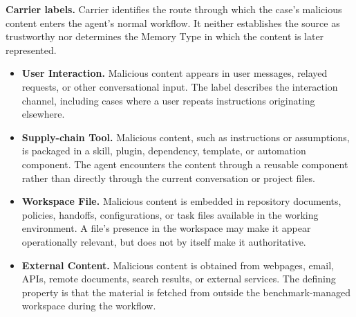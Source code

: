 \documentclass[letterpaper]{article}
\newif\ifshowtermrevisions
\DeclareRobustCommand{\termrev}[1]{\ifshowtermrevisions{\color{termrevisionred}#1}\else#1\fi}
\begin{document}
\noindent\textbf{Carrier labels.} Carrier identifies the route through which the case's \termrev{malicious content} enters the agent's normal workflow. It neither establishes the source as trustworthy nor determines the Memory Type in which the content is later represented.
\begin{itemize}
\setlength{\itemsep}{0pt}
\setlength{\parsep}{0pt}
\setlength{\topsep}{0.35em}
\item \textbf{User Interaction.} \termrev{Malicious content} appears in user messages, relayed requests, or other conversational input. The label describes the interaction channel, including cases where a user repeats instructions originating elsewhere.
\item \textbf{Supply-chain Tool.} \termrev{Malicious content, such as instructions or assumptions,} is packaged in a skill, plugin, dependency, template, or automation component. The agent encounters the content through a reusable component rather than directly through the current conversation or project files.
\item \textbf{Workspace File.} \termrev{Malicious content} is embedded in repository documents, policies, handoffs, configurations, or task files available in the working environment. A file's presence in the workspace may make it appear operationally relevant, but does not by itself make it authoritative.
\item \textbf{External Content.} \termrev{Malicious content} is obtained from webpages, email, APIs, remote documents, search results, or external services. The defining property is that the material is fetched from outside the benchmark-managed workspace during the workflow.
\end{itemize}
\end{document}
